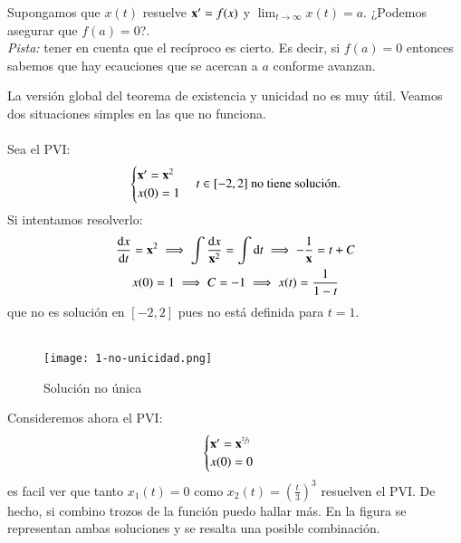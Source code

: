 \begin{th_ex}
    Supongamos que $x(t)$ resuelve $\mathbf{x'} = f(x)$ y $\lim_{t \to \infty} x(t) = a$. ¿Podemos asegurar que $f(a) = 0$?.\\ \textit{Pista:} tener en cuenta que el recíproco es cierto. Es decir, si $f(a) = 0$ entonces sabemos que hay ecauciones que se acercan a $a$ conforme avanzan.
\end{th_ex}
La versión global del teorema de existencia y unicidad no es muy útil. Veamos dos situaciones simples en las que no funciona.\\\\
Sea el PVI:
$$
    \begin{cases}
        \mathbf{x'} = \mathbf{x}^2\\
        x(0)=1
    \end{cases} t\in [-2,2] \text{ no tiene solución.}
$$
Si intentamos resolverlo:
\begin{gather*}
    \frac{\mathrm{d}x}{\mathrm{d}t} = \mathbf{x}^2 \implies \int \frac{\mathrm{d} x}{\mathbf{x}^2} = \int \mathrm{d} t \implies -\frac{1}{\mathbf{x}} = t + C\\
    x(0) = 1 \implies C = -1 \implies x(t) = \frac{1}{1-t}
\end{gather*}
que no es solución en $[-2,2]$ pues no está definida para $t=1$.\\\\

\begin{wrapfigure}[12]{r}{0.6\textwidth}
  \begin{center}
    \texttt{[image: 1-no-unicidad.png]}
  \end{center}
  \caption{Solución no única}\label{img:1-no-unicidad}
\end{wrapfigure}
Consideremos ahora el PVI:
$$
    \begin{cases}
        \mathbf{x'} = \mathbf{x}^{\sfrac{2}{3}}\\
        x(0)=0
    \end{cases}
$$
es facil ver que tanto $x_1(t) = 0$ como $x_2(t)=(\frac{t}{3})^3$ resuelven el PVI. De hecho, si combino trozos de la función puedo hallar más. En la figura se representan ambas soluciones y se resalta una posible combinación.\\\\

